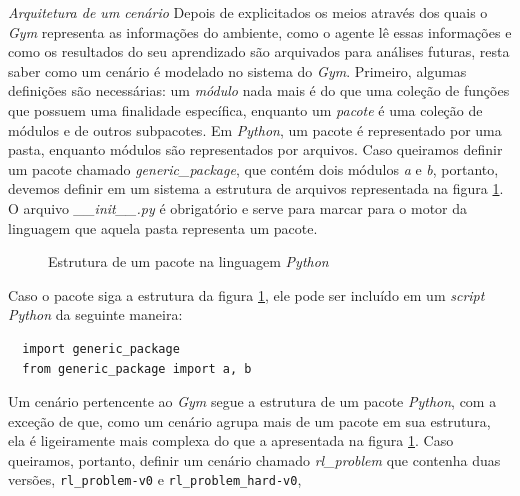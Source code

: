 \documentclass[cic,tc]{iiufrgs}
\begin{document}
\textit{Arquitetura de um cenário}
Depois de explicitados os meios através dos quais o \textit{Gym} representa as
informações do ambiente, como o agente lê essas informações e como os resultados
do seu aprendizado são arquivados para análises futuras, resta saber como um
cenário é modelado no sistema do \textit{Gym}. Primeiro, algumas definições são
necessárias: um \textit{módulo} nada mais é do que uma coleção de funções que
possuem uma finalidade específica, enquanto um \textit{pacote} é uma coleção de
módulos e de outros subpacotes. Em \textit{Python}, um pacote é representado por
uma pasta, enquanto módulos são representados por arquivos. Caso queiramos
definir um pacote chamado \textit{generic\_package}, que contém dois módulos
\textit{a} e \textit{b}, portanto, devemos definir em um sistema a estrutura de
arquivos representada na figura \ref{fig:python_package}. O arquivo
\textit{\_\_init\_\_.py} é obrigatório e serve para marcar para o motor da
linguagem que aquela pasta representa um pacote.

\begin{figure}[h]
  \label{fig:python_package}
  \caption{Estrutura de um pacote na linguagem \textit{Python}}
  \vspace{2mm}
  \begin{center}
\end{center}
\end{figure}

Caso o pacote siga a estrutura da figura \ref{fig:python_package}, ele pode ser
incluído em um \textit{script Python} da seguinte maneira:

\begin{verbatim}
  import generic_package
  from generic_package import a, b
\end{verbatim}

Um cenário pertencente ao \textit{Gym} segue a estrutura de um pacote
\textit{Python}, com a exceção de que, como um cenário agrupa mais de um pacote
em sua estrutura, ela é ligeiramente mais complexa do que a apresentada na
figura \ref{fig:python_package}. Caso queiramos, portanto, definir um cenário
chamado \textit{rl\_problem} que contenha duas versões, \texttt{rl\_problem-v0}
e \texttt{rl\_problem\_hard-v0},
\end{document}
